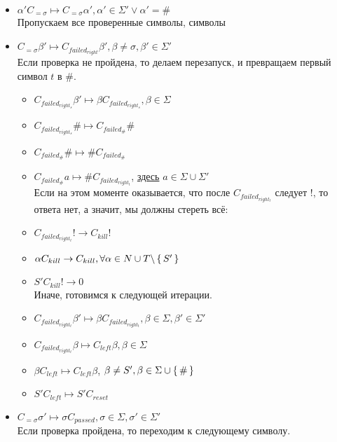 \begin{itemize}
\begin{itemize}
            \item $\alpha' C_{= \sigma} \mapsto C_{= \sigma} \alpha', \alpha' \in \Sigma' \lor \alpha' = \#$ \\
                Пропускаем все проверенные символы, символы
            \item $ C_{= \sigma}\beta' \mapsto C_{failed_{right}}\beta' , \beta \neq \sigma, \beta' \in \Sigma'$ \\
                Если проверка не пройдена, то делаем перезапуск, и превращаем первый символ $t$ в $\#$.
            \begin{itemize}
                \item $C_{failed_{right_s}} \beta' \mapsto \beta C_{failed_{right_s}}, \beta \in \Sigma$
                \item $C_{failed_{right_s}} \# \mapsto C_{failed_{\#}} \#$
                \item $C_{failed_{\#}} \# \mapsto \# C_{failed_{\#}}$
                \item $C_{failed_{\#}} a \mapsto \# C_{failed_{right_t}}$, \underline{здесь} $a \in \Sigma \cup \Sigma'$ \\
                    Если на этом моменте оказывается, что после $C_{failed_{right_t}}$ следует $!$, то ответа нет, а значит, мы должны стереть всё:
                \item $C_{failed_{right_t}}! \rightarrow C_{kill}!$
                \item $\alpha C_{kill} \rightarrow C_{kill}, \forall \alpha \in N \cup T \backslash \set{S'}$
                \item $S' C_{kill} ! \rightarrow 0$ \\
                    Иначе, готовимся к следующей итерации.
                \item $C_{failed_{right_t}}\beta' \mapsto \beta C_{failed_{right_t}}, \beta \in \Sigma, \beta' \in \Sigma'$
                \item $C_{failed_{right_t}}\beta \mapsto C_{left}\beta, \beta \in \Sigma$
                \item $\beta C_{left} \mapsto C_{left} \beta$, $\beta \neq S', \beta \in \Sigma \cup \set{\#}$
                \item $S'C_{left} \mapsto S'C_{reset}$
            \end{itemize} 
            \item $C_{=\sigma}\sigma' \mapsto \sigma C_{passed}, \sigma \in \Sigma, \sigma' \in \Sigma'$ \\
                Если проверка пройдена, то переходим к следующему символу.

\end{itemize}
\end{itemize}

